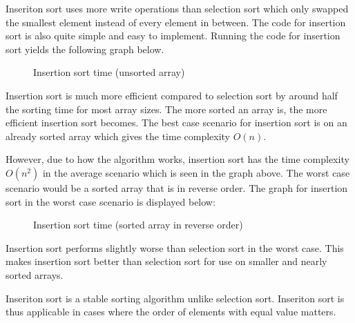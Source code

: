 \documentclass[a4paper,11pt]{article}
\begin{document}
Inseriton sort uses more write operations than selection sort which
only swapped the smallest element instead of every element in between. 
The code for insertion sort is also quite simple and easy to implement. 
Running the code for insertion sort yields the following graph below.

\begin{figure}[h]
  \centering
  \caption{Insertion sort time (unsorted array)}
  \label{fig:plot2}
\end{figure}

Insertion sort is much more efficient compared to selection sort by around
half the sorting time for most array sizes. The more sorted an array is, 
the more efficient insertion sort becomes. The best case scenario for 
insertion sort is on an already sorted array which gives the time 
complexity $ O(n)$. 

However, due to how the algorithm works, insertion sort has the time 
complexity $ O(n^2)$ in the average scenario which is seen in the graph 
above. The worst case scenario would be a sorted array that is in reverse 
order. The graph for insertion sort in the worst case scenario is 
displayed below:

\begin{figure}[h]
  \centering
  \caption{Insertion sort time (sorted array in reverse order)}
  \label{fig:plot3}
\end{figure}

Insertion sort performs slightly worse than selection sort in the worst 
case. This makes insertion sort better than selection sort for use on 
smaller and nearly sorted arrays.

Inseriton sort is a stable sorting algorithm unlike selection sort.
Inseriton sort is thus applicable in cases where the order of elements 
with equal value matters.
\end{document}
